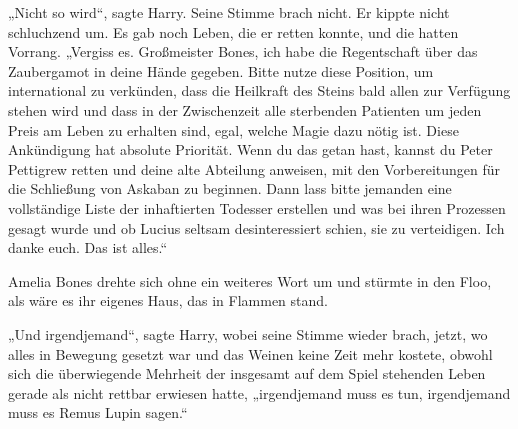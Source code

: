 „Nicht so wird“, sagte Harry. Seine Stimme brach nicht. Er kippte nicht schluchzend um.
Es gab noch Leben, die er retten konnte, und die hatten Vorrang. „Vergiss es. Großmeister Bones, ich habe die Regentschaft über das Zaubergamot in deine Hände gegeben. Bitte nutze diese Position, um international zu verkünden, dass die Heilkraft des Steins bald allen zur Verfügung stehen wird und dass in der Zwischenzeit alle sterbenden Patienten um jeden Preis am Leben zu erhalten sind, egal, welche Magie dazu nötig ist. Diese Ankündigung hat absolute Priorität. Wenn du das getan hast, kannst du Peter Pettigrew retten und deine alte Abteilung anweisen, mit den Vorbereitungen für die Schließung von Askaban zu beginnen. Dann lass bitte jemanden eine vollständige Liste der inhaftierten Todesser erstellen und was bei ihren Prozessen gesagt wurde und ob Lucius seltsam desinteressiert schien, sie zu verteidigen. Ich danke euch. Das ist alles.“

Amelia Bones drehte sich ohne ein weiteres Wort um und stürmte in den Floo, als wäre es ihr eigenes Haus, das in Flammen stand.

„Und irgendjemand“, sagte Harry, wobei seine Stimme wieder brach, jetzt, wo alles in Bewegung gesetzt war und das Weinen keine Zeit mehr kostete, obwohl sich die überwiegende Mehrheit der insgesamt auf dem Spiel stehenden Leben gerade als nicht rettbar erwiesen hatte, „irgendjemand muss es tun, irgendjemand muss es Remus Lupin sagen.“

